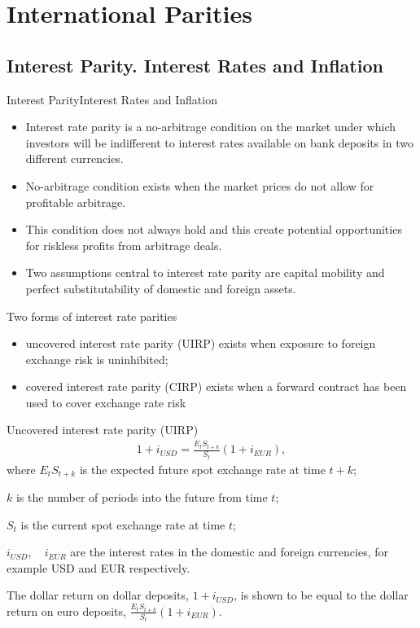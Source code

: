 \documentclass[international_finance_p2.tex]{subfiles}
\begin{document}
\section{International Parities}

\subsection{Interest Parity. Interest Rates and Inflation}
\begin{frame}{Interest Parity}{Interest Rates and Inflation}
\begin{itemize}[<+->]
\item
Interest rate parity is a no-arbitrage condition on the market under which investors will be indifferent to interest rates available on bank deposits in two different currencies. 
\item
No-arbitrage condition exists when the market prices do not allow for profitable arbitrage. 
\item
This condition does not always hold and this create potential opportunities for riskless profits from arbitrage deals. 
\item
Two assumptions central to interest rate parity are capital mobility and perfect substitutability of domestic and foreign assets.
\end{itemize}
\end{frame}
\begin{frame}{Two forms of interest rate parities}
\begin{itemize}[<+->]
\item
uncovered interest rate parity (UIRP) exists when exposure to foreign exchange risk  is uninhibited;
\item
covered interest rate parity (CIRP) exists when a forward contract has been used to cover  exchange rate risk
\end{itemize}
\end{frame}
\begin{frame}{Uncovered interest rate parity (UIRP)}
\begin{align}
1+i_{USD}=\frac{E_t S_{t+k}}{S_t}(1+i_{EUR}),
\end{align}
where
$E_t S_{t+k}$ is the expected future spot exchange rate at time $t + k$;

$k$ is the number of periods into the future from time $t$;

$S_t$ is the current spot exchange rate at time $t$;

$i_{USD},\quad i_{EUR}$  are the interest rates in the domestic and foreign currencies, for example USD and EUR respectively.

The dollar return on dollar deposits, $1+i_{USD}$, is shown to be equal to the dollar return on euro deposits, $\frac{E_t S_{t+k}}{S_t}(1+i_{EUR})$.
\end{frame}
\end{document}

